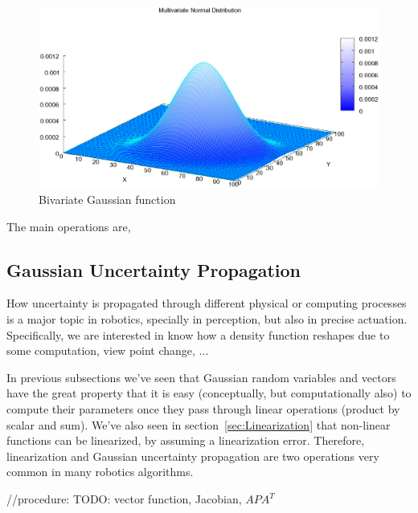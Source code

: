 \begin{figure}[bth!]
  \begin{center}
    \includegraphics[width=1.0\columnwidth]{figures/mv_gaussian.eps}
    \caption{Bivariate Gaussian function}
    \label{fig:mv_gaussian}
  \end{center}
\end{figure}

The main operations are,



\subsection{Gaussian Uncertainty Propagation}
How uncertainty is propagated through different physical or computing processes is a major topic in robotics, specially in perception, but also in precise actuation. Specifically, we are interested in know how a density function reshapes due to some computation, view point change, ...

In previous subsections we've seen that Gaussian random variables and vectors have the great property that it is easy (conceptually, but computationally also) to compute their parameters once they pass through linear operations (product by scalar and sum). We've also seen in section~\ref{sec:Linearization} that non-linear functions can be linearized, by assuming a linearization error. Therefore, linearization and Gaussian uncertainty propagation are two operations very common in many robotics algorithms. 

//procedure: TODO: vector function, Jacobian, $APA^T$


